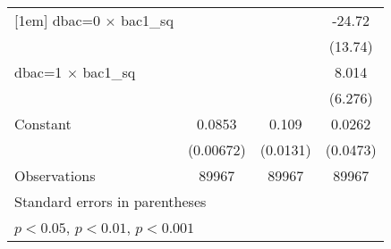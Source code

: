\begin{table}[htbp]
\begin{tabular}{l*{3}{c}}
[1em]
dbac=0 $\times$ bac1\_sq&                     &                     &      -24.72         \\
                    &                     &                     &     (13.74)         \\
[1em]
dbac=1 $\times$ bac1\_sq&                     &                     &       8.014         \\
                    &                     &                     &     (6.276)         \\
[1em]
Constant            &      0.0853\sym{***}&       0.109\sym{***}&      0.0262         \\
                    &   (0.00672)         &    (0.0131)         &    (0.0473)         \\
\hline
Observations        &       89967         &       89967         &       89967         \\
\hline\hline
\multicolumn{4}{l}{\footnotesize Standard errors in parentheses}\\
\multicolumn{4}{l}{\footnotesize \sym{*} \(p<0.05\), \sym{**} \(p<0.01\), \sym{***} \(p<0.001\)}\\
\end{tabular}
\end{table}
